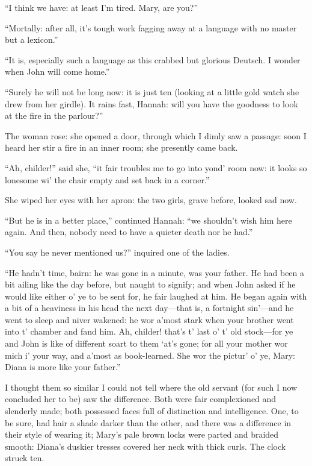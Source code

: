 \enquote{I think we have: at least I'm tired. Mary, are you?}

\enquote{Mortally: after all, it's tough work fagging away at a language
with no master but a lexicon.}

\enquote{It is, especially such a language as this crabbed but glorious
Deutsch. I wonder when \St{} John will come home.}

\enquote{Surely he will not be long now: it is just ten (looking at a
little gold watch she drew from her girdle). It rains fast, Hannah:
will you have the goodness to look at the fire in the parlour?}

The woman rose: she opened a door, through which I dimly saw a passage:
soon I heard her stir a fire in an inner room; she presently came back.

\enquote{Ah, childer!} said she, \enquote{it fair troubles me to go into
yond' room now: it looks so lonesome wi' the chair empty and set back in
a corner.}

She wiped her eyes with her apron: the two girls, grave before, looked
sad now.

\enquote{But he is in a better place,} continued Hannah: \enquote{we
shouldn't wish him here again. And then, nobody need to have a quieter
death nor he had.}

\enquote{You say he never mentioned us?} inquired one of the ladies.

\enquote{He hadn't time, bairn: he was gone in a minute, was your
father. He had been a bit ailing like the day before, but naught to
signify; and when \Mr{} \St{} John asked if he would like either o' ye to be
sent for, he fair laughed at him. He began again with a bit of a
heaviness in his head the next day---that is, a fortnight sin'---and he
went to sleep and niver wakened: he wor a'most stark when your brother
went into t' chamber and fand him. Ah, childer! that's t' last o' t'
old stock---for ye and \Mr{} \St{} John is like of different soart to them
\enquote{at's gone; for all your mother wor mich i} your way, and
a'most as book-learned. She wor the pictur' o' ye, Mary: Diana is more
like your father.}

I thought them so similar I could not tell where the old servant (for
such I now concluded her to be) saw the difference. Both were fair
complexioned and slenderly made; both possessed faces full of
distinction and intelligence. One, to be sure, had hair a shade darker
than the other, and there was a difference in their style of wearing it;
Mary's pale brown locks were parted and braided smooth: Diana's duskier
tresses covered her neck with thick curls. The clock struck ten.

